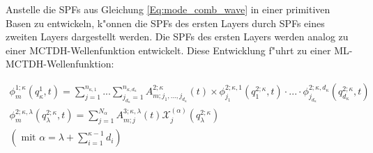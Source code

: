 Anstelle die SPFs aus Gleichung \ref{Eq:mode_comb_wave} in einer primitiven Basen zu entwickeln, k"onnen die SPFs des ersten Layers
durch SPFs eines zweiten Layers dargestellt werden. Die SPFs des ersten Layers werden analog zu einer MCTDH-Wellenfunktion entwickelt.
Diese Entwicklung f"uhrt zu einer ML-MCTDH-Wellenfunktion:

\begin{equation}
  \begin{gathered}
 \phi^{1;\kappa}_{m} (q^1_{\kappa}, t)=\sum^{n_{\kappa,1}}_{j=1} ... \sum^{n_{\kappa,d_\kappa}}_{j_{d_\kappa}=1} A^{2;\kappa}_{m;j_1,...,j_{d_\kappa}}(t)
 \times \phi^{2;\kappa,1}_{j_1} (q^{2;\kappa}_{1}, t) \cdot ... \cdot
 \phi^{2;\kappa,d_\kappa}_{j_{d_\kappa}} (q^{2;\kappa}_{d_\kappa}, t)
\\
 \phi^{2;\kappa, \lambda}_{m} (q^{2;\kappa}_{\lambda}, t)= \sum^{N_{\alpha}}_{j=1} A^{3;\kappa, \lambda}_{m;j}(t)
 \mathcal{X}^{(\alpha)}_{j}(q^{2;\kappa}_\lambda)
\\
 \left( \text{ mit } \alpha = \lambda + \sum^{\kappa - 1}_{i=1}d_i \right)
 \label{Eq:ml_mctdh_mode_SPF}
\end{gathered}
 \end{equation}

